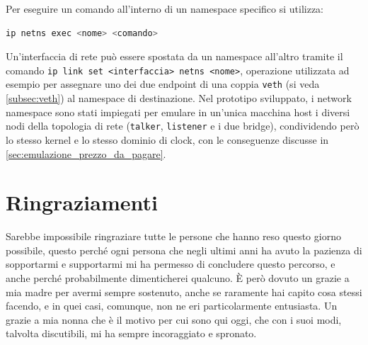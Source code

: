 \documentclass[12pt,a4paper,twoside]{book}
\begin{document}
\begin{appendices}
Per eseguire un comando all'interno di un namespace specifico si utilizza:

\begin{lstlisting}[language=bash, basicstyle=\ttfamily\small]
ip netns exec <nome> <comando>
\end{lstlisting}

Un'interfaccia di rete può essere spostata da un namespace all'altro tramite il comando \texttt{ip link set <interfaccia> netns <nome>}, operazione utilizzata ad esempio per assegnare uno dei due endpoint di una coppia \texttt{veth} (si veda \ref{subsec:veth}) al namespace di destinazione. Nel prototipo sviluppato, i network namespace sono stati impiegati per emulare in un'unica macchina host i diversi nodi della topologia di rete (\texttt{talker}, \texttt{listener} e i due bridge), condividendo però lo stesso kernel e lo stesso dominio di clock, con le conseguenze discusse in \ref{sec:emulazione_prezzo_da_pagare}.

\end{appendices}

\chapter*{Ringraziamenti}
Sarebbe impossibile ringraziare tutte le persone che hanno reso questo giorno possibile, questo perché ogni persona che negli ultimi anni ha avuto la pazienza di sopportarmi e supportarmi mi ha permesso di concludere questo percorso, e anche perché probabilmente dimenticherei qualcuno. È però dovuto un grazie a mia madre per avermi sempre sostenuto, anche se raramente hai capito cosa stessi facendo, e in quei casi, comunque, non ne eri particolarmente entusiasta. Un grazie a mia nonna che è il motivo per cui sono qui oggi, che con i suoi modi, talvolta discutibili, mi ha sempre incoraggiato e spronato.
\end{document}

